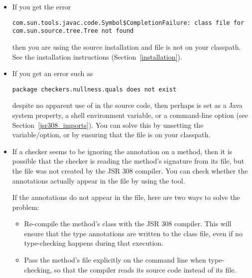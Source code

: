\begin{itemize}

\item
If you get the error

\begin{smaller}
\begin{Verbatim}
com.sun.tools.javac.code.Symbol$CompletionFailure: class file for com.sun.source.tree.Tree not found
\end{Verbatim}
\end{smaller}

\noindent
then you are using the source installation and file  is not
on your classpath.  See the installation instructions
(Section~\ref{installation}).


\item
If you get an error such as

\begin{Verbatim}
package checkers.nullness.quals does not exist
\end{Verbatim}

  \noindent
  despite no apparent use of  in
  the source code, then perhaps
   is set as a Java system property, a shell
  environment variable, or a command-line option (see
  Section~\ref{jsr308_imports}).  You can solve this by unsetting the
  variable/option, or by ensuring that the  file is on
  your classpath.


\item
If a checker seems to be ignoring the annotation on a method, then it is
possible that the checker is reading the method's signature from its
 file, but the  file was not created by the JSR
308 compiler.  You can check whether the annotations actually appear in the
 file by using the  tool.

If the annotations do not appear in the  file, here are two
ways to solve the problem:
\begin{itemize}
\item
  Re-compile the method's class with the JSR 308 compiler.  This will
  ensure that the type annotations are written to the class file, even if
  no type-checking happens during that execution.
\item
  Pass the method's file explicitly on the command line when type-checking,
  so that the compiler reads its source code instead of its 
  file.
\end{itemize}


\end{itemize}
